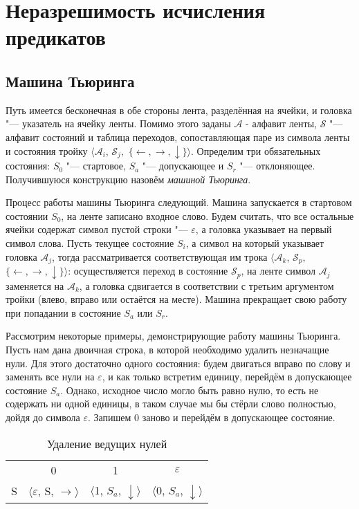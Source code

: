 \section{Неразрешимость исчисления предикатов}
\subsection{Машина Тьюринга}
\begin{definition} Путь имеется бесконечная в обе стороны лента,
разделённая на ячейки, и головка "--- указатель на ячейку ленты. Помимо этого заданы $\mathcal{A}$ -
алфавит ленты, $\mathcal{S}$ "--- алфавит состояний и таблица переходов, сопоставляющая паре из символа
ленты и состояния тройку $\langle\mathcal{A}_i$,  $\mathcal{S}_j,$  $\lbrace \leftarrow, \rightarrow,
\downarrow\rbrace\rangle$. Определим три обязательных состояния: $S_0$ "--- стартовое, $S_a$ "---
допускающее и $S_r$ "--- отклоняющее. Получившуюся конструкцию назовём \textit{машиной Тьюринга}.
\end{definition}

Процесс работы машины Тьюринга следующий. Машина запускается в стартовом состоянии $S_0$, на ленте
записано входное слово. Будем считать, что все остальные ячейки содержат символ пустой строки "---
$\varepsilon$, а головка указывает на первый символ слова. Пусть текущее состояние $S_i$, а символ на
который указывает головка $\mathcal{A}_j$, тогда рассматривается соответствующая им трока
$\langle\mathcal{A}_k$,  $\mathcal{S}_p,$  $\lbrace \leftarrow, \rightarrow, \downarrow \rbrace\rangle$:
осуществляется переход в состояние $\mathcal{S}_p$, на ленте символ $\mathcal{A}_j$ заменяется на
$\mathcal{A}_k$, а головка сдвигается в соответствии с третьим аргументом тройки (влево, вправо или
остаётся на месте). Машина прекращает свою работу при попадании в состояние $S_a$ или $S_r$.

Рассмотрим некоторые примеры, демонстрирующие работу машины Тьюринга. Пусть нам дана двоичная строка, в
которой необходимо удалить незначащие нули. Для этого достаточно одного состояния: будем двигаться вправо
по слову и заменять все нули на $\varepsilon$, и как только встретим единицу, перейдём в допускающее
состояние $S_a$. Однако, исходное число могло быть равно нулю, то есть не содержать ни одной единицы, в
таком случае мы бы стёрли слово полностью, дойдя до символа $\varepsilon$. Запишем 0 заново и перейдём в
допускающее состояние.

\begin{table}[h]
    \centering
    \begin{tabular}{c c c c}
        & 0 & 1 & $\varepsilon$ \\
        
        S & 
        $\langle\varepsilon$, S, $\rightarrow\rangle$ & 
        $\langle$1, $S_a$, $\downarrow\rangle$ & 
        $\langle$0, $S_a$, $\downarrow\rangle$ \\
    \end{tabular}
    \begin{flushleft}
    \caption[Пример ]{Удаление ведущих нулей}
    \end{flushleft}
    \label{tab:my_label}
\end{table}

